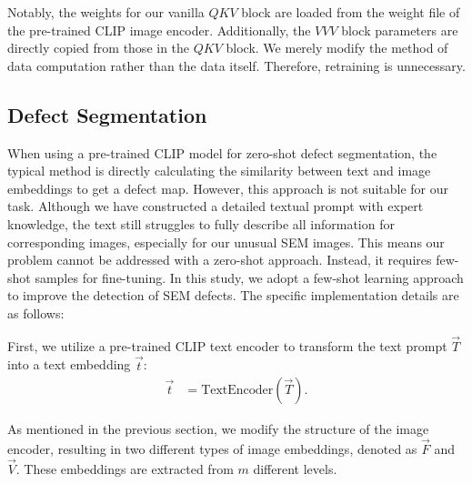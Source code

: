 Notably, the weights for our vanilla $QKV$ block are loaded from the weight file of the pre-trained CLIP image encoder. Additionally, the $VVV$ block parameters are directly copied from those in the $QKV$ block. We merely modify the method of data computation rather than the data itself. Therefore, retraining is unnecessary.

\subsection{Defect Segmentation}
\label{sub:Defect Segmentation}
When using a pre-trained CLIP model for zero-shot defect segmentation, the typical method is directly calculating the similarity between text and image embeddings to get a defect map. However, this approach is not suitable for our task. Although we have constructed a detailed textual prompt with expert knowledge,
the text still struggles to fully describe all information for corresponding images, especially for our unusual SEM images.
This means our problem cannot be addressed with a zero-shot approach. Instead, it requires few-shot samples for fine-tuning. In this study, we adopt a few-shot learning approach 
to improve the detection of SEM defects. The specific implementation details are as follows:


First, we utilize a pre-trained CLIP text encoder to transform the text prompt $\vec{T}$ into a text embedding $\vec{t}$:
\begin{align}
\vec{t} &= \text{TextEncoder}(\vec{T}).
\end{align}

As mentioned in the previous section, we modify the structure of the image encoder, resulting in two different types of image embeddings, denoted as $\vec{F}$ and $\vec{V}$. These embeddings are extracted from $m$ different levels.

